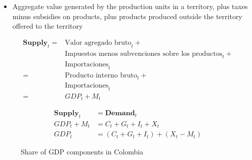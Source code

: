 \documentclass[
  ignorenonframetext,
]{beamer}
\providecommand{\tightlist}{%
  \setlength{\itemsep}{0pt}\setlength{\parskip}{0pt}}\usepackage{longtable,booktabs,array}
\begin{document}
\begin{frame}{}
\label{section-12}
\begin{itemize}
\tightlist
\item
  Aggregate value generated by the production units in a territory, plus
  taxes minus subsidies on products, plus products produced outside the
  territory offered to the territory
\end{itemize}

\[\begin{split}
  \mathbf{Supply}_t  = & \text{Valor agregado bruto}_t + \\
  & \text{Impuestos menos subvenciones sobre los productos}_t + \\
  & \text{Importaciones}_t \\
  = & \text{Producto interno bruto}_t + \\
  & \text{Importaciones}_t \\
  = & GDP_t + M_t
  \end{split}\]
\end{frame}

\begin{frame}{}
\label{section-13}
\[\begin{split}
  \mathbf{Supply}_t & = \mathbf{Demand}_t \\
  GDP_t + M_t & = C_t + G_t + I_t + X_t \\
  GDP_t & = (C_t + G_t + I_t) + (X_t - M_t)
  \end{split}\]
\end{frame}

\begin{frame}{}
\label{section-14}
\begin{figure}


\caption{\label{fig-share-gdp-components-col}Share of GDP components in
Colombia}

\end{figure}%
\end{frame}
\end{document}
